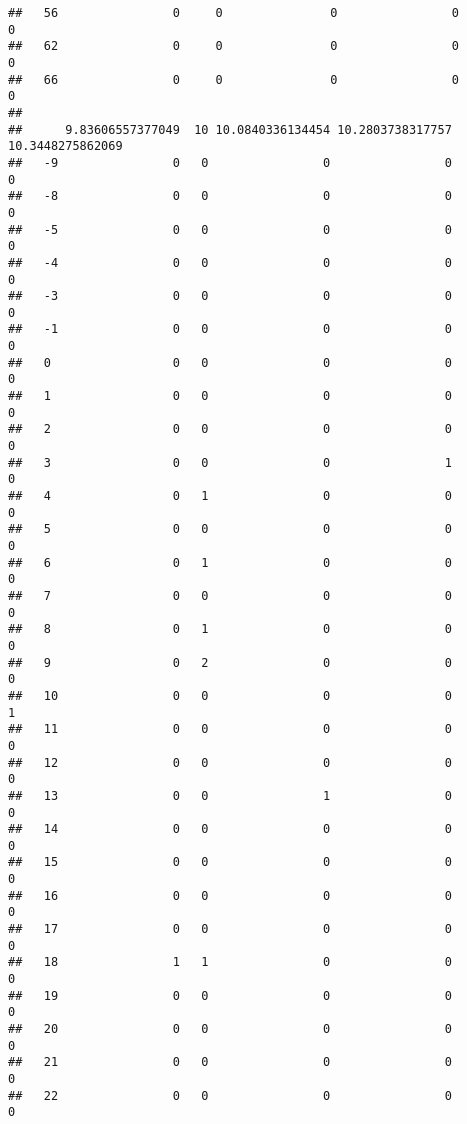 \documentclass[]{article}
\begin{document}
\begin{verbatim}
##   56                0     0               0                0                0
##   62                0     0               0                0                0
##   66                0     0               0                0                0
##     
##      9.83606557377049  10 10.0840336134454 10.2803738317757 10.3448275862069
##   -9                0   0                0                0                0
##   -8                0   0                0                0                0
##   -5                0   0                0                0                0
##   -4                0   0                0                0                0
##   -3                0   0                0                0                0
##   -1                0   0                0                0                0
##   0                 0   0                0                0                0
##   1                 0   0                0                0                0
##   2                 0   0                0                0                0
##   3                 0   0                0                1                0
##   4                 0   1                0                0                0
##   5                 0   0                0                0                0
##   6                 0   1                0                0                0
##   7                 0   0                0                0                0
##   8                 0   1                0                0                0
##   9                 0   2                0                0                0
##   10                0   0                0                0                1
##   11                0   0                0                0                0
##   12                0   0                0                0                0
##   13                0   0                1                0                0
##   14                0   0                0                0                0
##   15                0   0                0                0                0
##   16                0   0                0                0                0
##   17                0   0                0                0                0
##   18                1   1                0                0                0
##   19                0   0                0                0                0
##   20                0   0                0                0                0
##   21                0   0                0                0                0
##   22                0   0                0                0                0

\end{verbatim}
\end{document}
